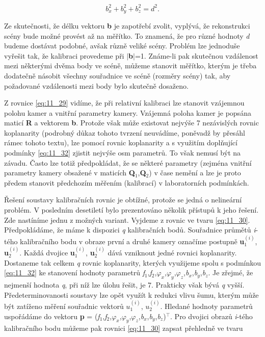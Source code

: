 \begin{equation} \label{eq:11_32}
    b_{x}^{2} + b_{y}^{2} + b_{z}^{2} = d^{2} .
\end{equation}

Ze skutečnosti, že délku vektoru \textbf{b} je zapotřebí zvolit, vyplývá, že rekonstrukci scény bude možné provést až na měřítko. To znamená, že pro různé hodnoty \textit{d} budeme dostávat podobné, avšak různě veliké scény. Problém lze jednoduše vyřešit tak, že kalibraci provedeme při $\mid$\textbf{b}$\mid$=1. Známe-li pak skutečnou vzdálenost mezi některými dvěma body ve scéně, můžeme stanovit měřítko, kterým je třeba dodatečně násobit všechny souřadnice ve scéně (rozměry scény) tak, aby požadované vzdálenosti mezi body bylo skutečně dosaženo.

Z rovnice \eqref{eq:11_29} vidíme, že při relativní kalibraci lze stanovit vzájemnou polohu kamer a vnitřní parametry kamery. Vzájemná poloha kamer je popsána maticí \textbf{R} a vektorem \textbf{b}. Protože však může existovat nejvýše 7 nezávislých rovnic koplanarity (podrobný důkaz tohoto tvrzení neuvádíme, poněvadž by přesáhl rámec tohoto textu), lze pomocí rovnic koplanarity a s využitím doplňující podmínky \eqref{eq:11_32} zjistit nejvýše osm parametrů. To však nemusí být na závadu. Často lze totiž předpokládat, že se některé parametry (zejména vnitřní parametry kamery obsažené v maticích \textbf{Q}$_1$,\textbf{Q}$_2$) v čase nemění a lze je proto předem stanovit předchozím měřením (kalibrací) v laboratorních podmínkách.

Řešení soustavy kalibračních rovnic je obtížné, protože se jedná o nelineární problém. V posledním desetiletí bylo prezentováno několik přístupů k jeho řešení. Zde nastíníme jednu z možných variant. Vyjdeme z rovnic ve tvaru \eqref{eq:11_30}. Předpokládáme, že máme k dispozici \textit{q} kalibračních bodů. Souřadnice průmětů \textit{i}-tého kalibračního bodu v obraze první a druhé kamery označíme postupně \textbf{u}$_1^{(i)}$, \textbf{u}$_2^{(i)}$. Každá dvojice \textbf{u}$_1^{(i)}$, \textbf{u}$_2^{(i)}$ dává vzniknout jedné rovnici koplanarity. Dostaneme tak celkem \textit{q} rovnic koplanarity, kterých využijeme spolu s podmínkou \eqref{eq:11_32} ke stanovení hodnoty parametrů \textit{f}$_1$,\textit{f}$_2$,$\varphi_x$,$\varphi_y$,$\varphi_z$,\textit{b}$_x$,\textit{b}$_y$,\textit{b}$_z$. Je zřejmé, že nejmenší hodnota \textit{q}, při níž lze úlohu řešit, je 7. Prakticky však bývá \textit{q} vyšší. Předeterminovanosti soustavy lze opět využít k redukci vlivu šumu, kterým může být zatíženo měření souřadnic vektorů $u_1^{(i)}$, $u_2^{(i)}$. Hledané hodnoty parametrů uspořádáme do vektoru \textbf{p} = (\textit{f}$_1$,\textit{f}$_2$,$\varphi_x$,$\varphi_y$,$\varphi_z$,\textit{b}$_x$,\textit{b}$_y$,\textit{b}$_z$)$^\top$. Pro dvojici obrazů \textit{i}-tého kalibračního bodu můžeme pak rovnici \eqref{eq:11_30} zapsat přehledně ve tvaru

